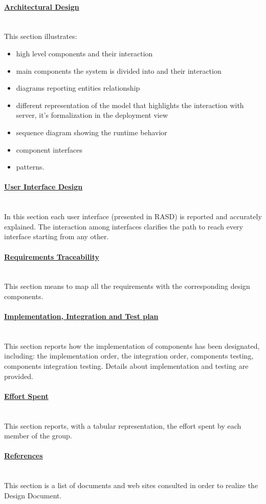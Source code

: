 \paragraph{\hyperref[sect:architecturalDesign]{Architectural Design}} \mbox{}\\
This section illustrates:
\begin{itemize}
\item high level components and their interaction
\item main components the system is divided into and their interaction
\item diagrams reporting entities relationship
\item different representation of the model that highlights the interaction with server, it’s formalization in the deployment view
\item sequence diagram showing the runtime behavior 
\item component interfaces 
\item patterns.
\end{itemize}
\paragraph{\hyperref[sect:userInterfaceDesign]{User	 Interface Design}}\mbox{}\\
In this section each user interface (presented in RASD) is reported and accurately explained. The interaction among interfaces clarifies the path to reach every interface starting from any other. 
\paragraph{\hyperref[sect:requirementsTraceability]{Requirements Traceability}}\mbox{}\\
This section means to map all the requirements with the corresponding design components. 
\paragraph{\hyperref[sect:implementationIntegrationTestplan]{Implementation, Integration and Test plan}}\mbox{}\\
This section reports how the implementation of components has been designated, including: the implementation order, the integration order, components testing, components integration testing. Details about implementation and testing are provided.  
\paragraph{\hyperref[sect:effort]{Effort Spent}}\mbox{}\\
This section reports, with a tabular representation, the effort spent by each member of the group. 
\paragraph{\hyperref[sect:references]{References}}\mbox{}\\
This section is a list of documents and web sites consulted in order to realize the Design Document. 


